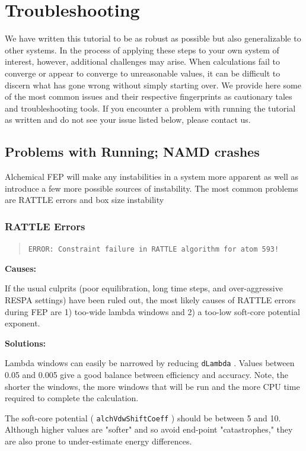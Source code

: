 \documentclass[9pt,tutorial]{Styling/livecoms}
\newcommand{\textInput}[1]{
  \texttt{#1}
}
\begin{document}
\section{Troubleshooting}\label{app:troubleshooting}
We have written this tutorial to be as robust as possible but also generalizable to other systems. 
In the process of applying these steps to your own system of interest, however, additional challenges may arise. 
When calculations fail to converge or appear to converge to unreasonable values, it can be difficult to discern what has gone wrong without simply starting over. 
We provide here some of the most common issues and their respective fingerprints as cautionary tales and troubleshooting tools. 
If you encounter a problem with running the tutorial as written and do not see your issue listed below, please contact us.

\subsection{Problems with Running; NAMD crashes}
Alchemical FEP will make any instabilities in a system more apparent as well as introduce a few more possible sources of instability. The most common problems are RATTLE errors and box size instability


\subsubsection{RATTLE Errors}
\begin{quote}
\texttt{ERROR: Constraint failure in RATTLE algorithm for atom 593!}
\end{quote}

\noindent\textbf{Causes:}

If the usual culprits (poor equilibration, long time steps, and over-aggressive RESPA settings) have been ruled out, the most likely causes of RATTLE errors during FEP are 1) too-wide lambda windows and 2) a too-low soft-core potential exponent.

\noindent\textbf{Solutions:}

Lambda windows can easily be narrowed by reducing \textInput{dLambda}. Values between 0.05 and 0.005 give a good balance between efficiency and accuracy.
Note, the shorter the windows, the more windows that will be run and the more CPU time required to complete the calculation.

The soft-core potential (\textInput{alchVdwShiftCoeff}) should be between 5 and 10. Although higher values are "softer" and so avoid end-point "catastrophes," they are also prone to under-estimate energy differences.
\end{document}
